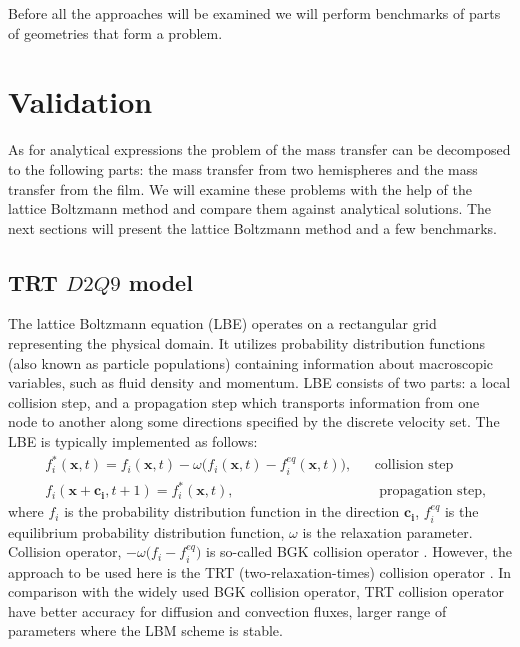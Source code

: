\documentclass{article}
\begin{document}
Before all the approaches will be examined we will perform benchmarks of parts of geometries that
form a problem.

\section{Validation}
As for analytical expressions the problem of the mass transfer can be decomposed to the following
parts: the mass transfer from two hemispheres and the mass transfer from the film. We will examine
these problems with the help of the lattice Boltzmann method and compare them against analytical
solutions. The next sections will present the lattice Boltzmann method and a few benchmarks.

\subsection{TRT $D2Q9$ model}
The lattice Boltzmann equation (LBE) operates on a rectangular grid representing the
physical domain. It utilizes
probability distribution functions (also known as particle populations)
containing information about
macroscopic variables, such as fluid density and momentum. LBE consists of
two parts: a local collision step, and a propagation step which transports
information from one node to another along some 
directions specified by the discrete velocity set.
The LBE is typically implemented as follows:
\begin{equation}
\label{standard:implementation}
\begin{aligned}
&f_i^{*}(\bm{x},t)= f_i(\bm{x},t)-\omega \bigl(f_i(\bm{x},t)-f_i^{eq}(\bm{x},t)\bigr),&&\text{
collision step}\\
&f_i(\bm{x}+\bm{c_i},t+1)=f_i^{*}(\bm{x},t),&&\text{ propagation step}, 
\end{aligned}
\end{equation}
where $f_i$ is the probability distribution function in the direction $\bm{c_i}$,
 $f_i^{eq}$ is the equilibrium probability distribution function, $\omega$ is the
relaxation parameter. Collision operator, $-\omega \bigl(f_i- f_i^{eq}\bigr)$ is so-called BGK
collision operator \cite{bgk}. However, the approach to be used here is the TRT
(two-relaxation-times) collision operator \cite{ginzburg-main,ginzburg-saturated-flow}. In
comparison with the widely used BGK collision operator, TRT collision operator have better accuracy
for diffusion and convection fluxes, larger range of parameters where the LBM scheme is stable.
\end{document}
